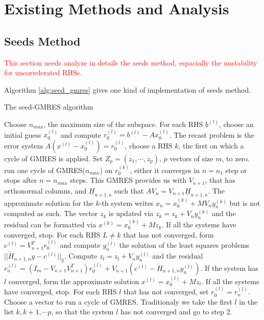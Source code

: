 \section{Existing Methods and Analysis}
\subsection{Seeds Method}

\textcolor{red}{This section needs analyze in details the seeds method, espacially the unstability for uncorrelerated RHSs.}

Algorithm \ref{alg:seed_gmres} gives one kind of implementation of seeds method.

\begin{algorithm}[htbp]{}
	\caption{The seed-GMRES algorithm}   
	\label{alg:seed_gmres}   
	\begin{algorithmic}[1]
		\State Choose $n_{max}$, the maximum size of the subspace. For each RHS $b^{(l)}$, choose an initial guess $x_0^{(l)}$ and compute $r_0^{(l)} = b^{(l)}-Ax_0^{(l)}$. The recast problem is the error system $A(x^{(l)}-x_0^{(l)})=r_0^{(l)}$, choose a RHS $k$, the first on which a cycle of GMRES is applied. Set $Z_p=(z_1,\cdots, z_p)$, $p$ vectors of size $m$, to zero.
		\State run one cycle of GMRES($n_{max}$) on $r_0^{(k)}$, either it converges in $n=n_1$ step or stops after $n=n_{max}$ steps. This GMRES provides us with $V_{n+1}$, that has orthonormal columns, and $\underline{H}_{n+1,n}$ such that $AV_n=V_{n+1}\underline{H}_{n+1,n}$. The approximate solution for the $k$-th system writes $x_n=x_0^{(k)}+MV_ny_n^{(k)}$ but is not computed as such. The vector $z_k$ is updated via $z_k=z_k+V_ny_n^{(k)}$ and the residual can be formatted via $x^{(k)}=x_0^{(k)}+Mz_k$. If all the systems have converged, stop.
		\State For each RHS $L \neq k$ that has not converged, form $c^{(l)}= V_{n+1}^Tr_0^{(l)}$ and compute $y_n^{(l)}$ the solution of the least squares problems $||\underleftarrow{H}_{n+1,n}y-c^{(l)}||_2$. Compute $z_l=z_l+V_ny_n^{(l)}$ and the residual $r_n^{(l)}=(I_m-V_{n+1}V_{n+1}^T)r_0^{(l)}+V_{n+1}(c^{(l)}-\underleftarrow{H}_{n+1,n}y_n^{(l)})$. If the system has $l$ converged, form the approximate solution $x^{(l)}=x_0^{(l)}+Mz_l$. If all the systems have converged, stop.
		\State For each RHS $l$ that has not converged, set $r_0^{(l)}=r_n^{(l)}$. Choose a vector to run a cycle of GMRES. Traditionaly we take the first $l$ in the list $k, k+1, \cdots p$, so that the system $l$ has not converged and go to step $2$. 
	\end{algorithmic}  
\end{algorithm}

